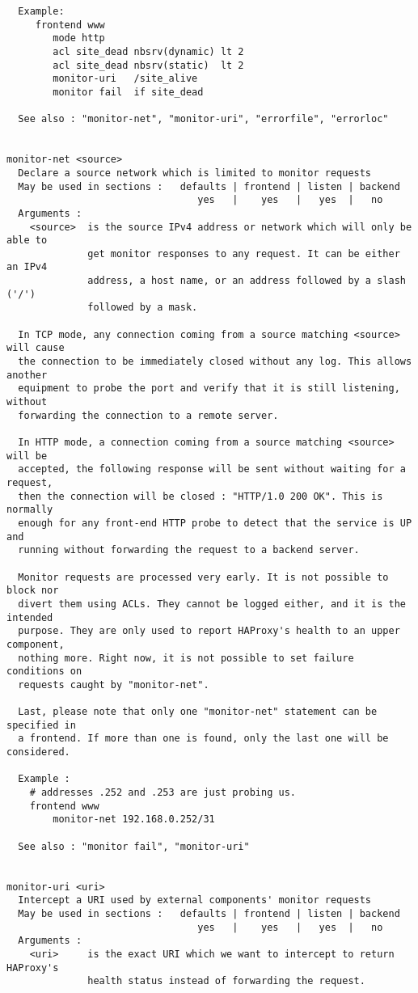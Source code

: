 \begin{verbatim}
  Example:
     frontend www
        mode http
        acl site_dead nbsrv(dynamic) lt 2
        acl site_dead nbsrv(static)  lt 2
        monitor-uri   /site_alive
        monitor fail  if site_dead

  See also : "monitor-net", "monitor-uri", "errorfile", "errorloc"


monitor-net <source>
  Declare a source network which is limited to monitor requests
  May be used in sections :   defaults | frontend | listen | backend
                                 yes   |    yes   |   yes  |   no
  Arguments :
    <source>  is the source IPv4 address or network which will only be able to
              get monitor responses to any request. It can be either an IPv4
              address, a host name, or an address followed by a slash ('/')
              followed by a mask.

  In TCP mode, any connection coming from a source matching <source> will cause
  the connection to be immediately closed without any log. This allows another
  equipment to probe the port and verify that it is still listening, without
  forwarding the connection to a remote server.

  In HTTP mode, a connection coming from a source matching <source> will be
  accepted, the following response will be sent without waiting for a request,
  then the connection will be closed : "HTTP/1.0 200 OK". This is normally
  enough for any front-end HTTP probe to detect that the service is UP and
  running without forwarding the request to a backend server.

  Monitor requests are processed very early. It is not possible to block nor
  divert them using ACLs. They cannot be logged either, and it is the intended
  purpose. They are only used to report HAProxy's health to an upper component,
  nothing more. Right now, it is not possible to set failure conditions on
  requests caught by "monitor-net".

  Last, please note that only one "monitor-net" statement can be specified in
  a frontend. If more than one is found, only the last one will be considered.
 
  Example :
    # addresses .252 and .253 are just probing us.
    frontend www
        monitor-net 192.168.0.252/31

  See also : "monitor fail", "monitor-uri"


monitor-uri <uri>
  Intercept a URI used by external components' monitor requests
  May be used in sections :   defaults | frontend | listen | backend
                                 yes   |    yes   |   yes  |   no
  Arguments :
    <uri>     is the exact URI which we want to intercept to return HAProxy's
              health status instead of forwarding the request.


\end{verbatim}
